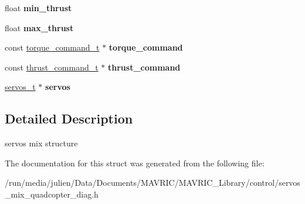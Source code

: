 \begin{DoxyCompactItemize}
\item 
\hypertarget{structservo__mix__quadcotper__diag__t_a682cd7cb18f9e1af2d0678bda079a01b}{float {\bfseries min\+\_\+thrust}}\label{structservo__mix__quadcotper__diag__t_a682cd7cb18f9e1af2d0678bda079a01b}

\item 
\hypertarget{structservo__mix__quadcotper__diag__t_a9e600042d881b710a7f847db43744f3d}{float {\bfseries max\+\_\+thrust}}\label{structservo__mix__quadcotper__diag__t_a9e600042d881b710a7f847db43744f3d}

\item 
\hypertarget{structservo__mix__quadcotper__diag__t_a6767a151d9bb886444e2139cead09f92}{const \hyperlink{structtorque__command__t}{torque\+\_\+command\+\_\+t} $\ast$ {\bfseries torque\+\_\+command}}\label{structservo__mix__quadcotper__diag__t_a6767a151d9bb886444e2139cead09f92}

\item 
\hypertarget{structservo__mix__quadcotper__diag__t_aa6742bf0ba6855d06e5a0a2e43451647}{const \hyperlink{structthrust__command__t}{thrust\+\_\+command\+\_\+t} $\ast$ {\bfseries thrust\+\_\+command}}\label{structservo__mix__quadcotper__diag__t_aa6742bf0ba6855d06e5a0a2e43451647}

\item 
\hypertarget{structservo__mix__quadcotper__diag__t_a9d9cd54cc3ca88ed67dd0909605449e3}{\hyperlink{structservos__t}{servos\+\_\+t} $\ast$ {\bfseries servos}}\label{structservo__mix__quadcotper__diag__t_a9d9cd54cc3ca88ed67dd0909605449e3}

\end{DoxyCompactItemize}


\subsection{Detailed Description}
servos mix structure 

The documentation for this struct was generated from the following file\+:\begin{DoxyCompactItemize}
\item 
/run/media/julien/\+Data/\+Documents/\+M\+A\+V\+R\+I\+C/\+M\+A\+V\+R\+I\+C\+\_\+\+Library/control/servos\+\_\+mix\+\_\+quadcopter\+\_\+diag.\+h\end{DoxyCompactItemize}
